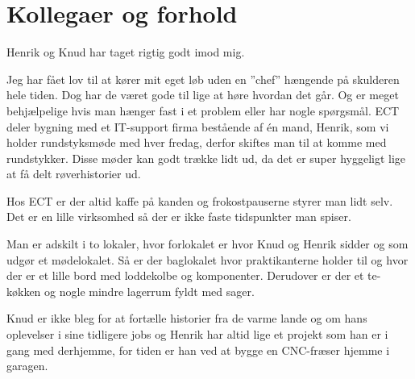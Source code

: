 \chapter{Kollegaer og forhold}

Henrik og Knud har taget rigtig godt imod mig. 

Jeg har fået lov til at kører mit eget løb uden en ''chef'' hængende på skulderen hele tiden. Dog har de været gode til lige at høre hvordan det går. Og er meget behjælpelige hvis man hænger fast i et problem eller har nogle spørgsmål. ECT deler bygning med et IT-support firma bestående af én mand, Henrik, som vi holder rundstyksmøde med hver fredag, derfor skiftes man til at komme med rundstykker. Disse møder kan godt trække lidt ud, da det er super hyggeligt lige at få delt røverhistorier ud.

Hos ECT er der altid kaffe på kanden og frokostpauserne styrer man lidt selv. Det er en lille virksomhed så der er ikke faste tidspunkter man spiser.

Man er adskilt i to lokaler, hvor forlokalet er hvor Knud og Henrik sidder og som udgør et mødelokalet. Så er der baglokalet hvor praktikanterne holder til og hvor der er et lille bord med loddekolbe og komponenter. Derudover er der et te-køkken og nogle mindre lagerrum fyldt med sager.

Knud er ikke bleg for at fortælle historier fra de varme lande og om hans oplevelser i sine tidligere jobs og Henrik har altid lige et projekt som han er i gang med derhjemme, for tiden er han ved at bygge en CNC-fræser hjemme i garagen.

